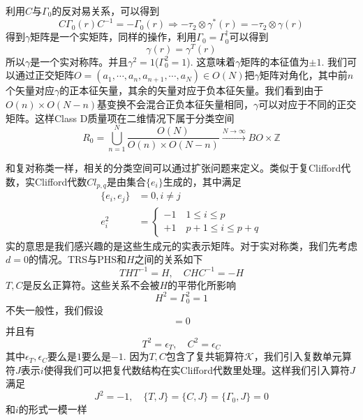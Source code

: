 \documentclass[a4paper]{article}
\numberwithin{equation}{subsection}
\begin{document}
利用$C$与$\Gamma_0$的反对易关系，可以得到
\begin{equation}
    C\Gamma_0(r)C^{-1}=-\Gamma_0(r)\Rightarrow -\tau_2\otimes \gamma^*(r)=-\tau_2\otimes \gamma(r)
\end{equation}
得到$\gamma$矩阵是一个实矩阵，同样的操作，利用$\Gamma_0=\Gamma_0^\dagger$可以得到
\begin{equation}
    \gamma(r)=\gamma^T(r)
\end{equation}
所以$\gamma$是一个实对称阵。并且$\gamma^2=1$($\Gamma_0^2=1$). 这意味着$\gamma$矩阵的本征值为$\pm 1$. 我们可以通过正交矩阵$O=(a_1,\cdots,a_n,a_{n+1},\cdots,a_N)\in O(N)$把$\gamma$矩阵对角化，其中前$n$个矢量对应$\gamma$的正本征矢量，其余的矢量对应于负本征矢量。我们看到由于$O(n)\times O(N-n)$基变换不会混合正负本征矢量相同，$\gamma$可以对应于不同的正交矩阵。这样Class D质量项在二维情况下属于分类空间
\begin{equation}
    R_0=\bigcup_{n=1}^{N}\frac{O(N)}{O(n)\times O(N-n)}\stackrel{N\to\infty}{\longrightarrow} BO\times \mathbb{Z}
\end{equation}

和复对称类一样，相关的分类空间可以通过扩张问题来定义。类似于复Clifford代数，实Clifford代数$Cl_{p,q}$是由集合$\{e_i\}$生成的，其中满足
\begin{equation}
    \begin{split}
        \{e_i,e_j\}&=0,i\neq j\\
        e_i^2&=\begin{cases}
            -1\quad 1\leq i\leq p\\
            +1\quad p+1\leq i\leq p+q
        \end{cases}
    \end{split}
\end{equation}
实的意思是我们感兴趣的是这些生成元的实表示矩阵。对于实对称类，我们先考虑$d=0$的情况。TRS与PHS和$H$之间的关系如下
\begin{equation}
    THT^{-1}=H,\quad CHC^{-1}=-H
\end{equation}
$T,C$是反幺正算符。这些关系不会被$H$的平带化所影响
\begin{equation}
    H^2=\Gamma_0^2=1
\end{equation}
不失一般性，我们假设
\begin{equation}
    [T,C]=0
\end{equation}
并且有
\begin{equation}
    T^2=\epsilon_T,\quad C^2=\epsilon_C
\end{equation}
其中$\epsilon_T,\epsilon_C$要么是$1$要么是$-1$. 因为$T,C$包含了复共轭算符$\mathcal{K}$，我们引入复数单元算符$J$表示$i$使得我们可以把复代数结构在实Clifford代数里处理。这样我们引入算符$J$满足
\begin{equation}
    J^2=-1,\quad \{T,J\}=\{C,J\}=\{\Gamma_0,J\}=0
\end{equation}
和$i$的形式一模一样
\end{document}

